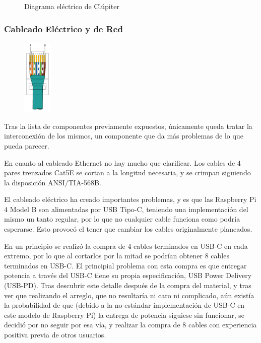 
\begin{figure}[H]
  \centering
  \vspace*{0.5cm}
  \def\svgwidth{\textwidth}
  
  \caption{Diagrama eléctrico de Clúpiter}
  \label{fig:raspi_electric_diagram}
\end{figure}

\subsubsection{Cableado Eléctrico y de Red}
\label{sssec:cableado_electrico_red}
\begin{figure}
  \centering
  \vspace*{-1.25cm}
  \includegraphics[width=0.125\textwidth]{img/TIA-568B.png}
  \label{fig:TIA-568B}
\end{figure}
Tras la lista de componentes previamente expuestos, únicamente queda tratar la interconexión de los mismos, un componente que da más problemas de lo que pueda parecer.

En cuanto al cableado Ethernet no hay mucho que clarificar. Los cables de 4 pares trenzados Cat5E se cortan a la longitud necesaria, y se crimpan siguiendo la disposición ANSI/TIA-568B.

El cableado eléctrico ha creado importantes problemas, y es que las Raspberry Pi 4 Model B son alimentadas por USB Tipo-C, teniendo una implementación del mismo un tanto regular, por lo que no cualquier cable funciona como podría esperarse. Esto provocó el tener que cambiar los cables originalmente planeados.

En un principio se realizó la compra de 4 cables terminados en USB-C en cada extremo, por lo que al cortarlos por la mitad se podrían obtener 8 cables terminados en USB-C. El principial problema con esta compra es que entregar potencia a través del USB-C tiene su propia especificación, USB Power Delivery (USB-PD). Tras descubrir este detalle después de la compra del material, y tras ver que realizando el arreglo, que no resultaría ni caro ni complicado, aún existía la probabilidad de que (debido a la no-estándar implementación de USB-C en este modelo de Raspberry Pi) la entrega de potencia siguiese sin funcionar, se decidió por no seguir por esa vía, y realizar la compra de 8 cables con experiencia positiva previa de otros usuarios. 

